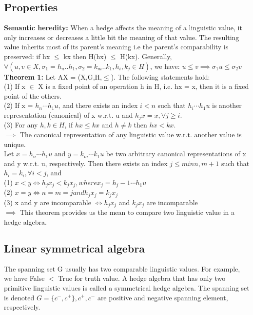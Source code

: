 \documentclass[26pt,fleqn,]{article}
\begin{document}
\subsection{Properties}
	{\bfseries Semantic heredity:} When a hedge affects the meaning of a linguistic value, it only
	increases or decreases a little bit the meaning of that value. The resulting value inherits
	most of its parent's meaning i.e the parent's comparability is preserved: 
	if hx \(\le\) kx then H(hx) \(\le\) H(kx). Generally, \(\forall (u,v \in X, 
	\sigma_1 = h_n..h_1, \sigma_2 = k_m..k_1, h_i,k_j \in H)\), we have:
	\(u \le v \implies \sigma_1u \le \sigma_2v\)\\
	{\bfseries Theorem 1:} Let AX = (X,G,H,\(\le\)). The following statements hold:\\
\indent (1) If x \(\in\) X is a fixed point of an operation h in H, i.e. hx = x, then it is a fixed
	 point of the others.\\
\indent (2) If x = \(h_n \cdots h_1 u\), and there exists an index \(i<n\) such that \(h_i \cdots h_1 u\)        is another representation (canonical) of x w.r.t. u and \(h_j x = x, \forall j\ge i\).\\
\indent (3) For any \(h, k\in H\), if \(hx\le kx\) and \(h\neq k\) then \(hx< kx\).\\
\indent \(\implies\) The canonical representation of any linguistic value w.r.t. another value is unique.	\\
 Let \(x = h_n \cdots h_1 u\) and \(y = k_m \cdots k_1 u\) be two arbitrary
	canonical representations of x and y w.r.t. u, respectively. Then there exists an index
	\(j \le min{n, m} + 1\) such that \(h_i = k_i, \forall i < j\), and\\
\indent (1) \(x < y \iff h_j x_j < k_j x_j , where x_j = h_j-1 \cdots h_1 u\)\\
\indent (2) \(x = y \iff n = m = j and h_j x_j = k_j x_j\)\\
\indent (3) x and y are incomparable \(\iff h_j x_j\) and \(k_j x_j\) are incomparable\\
\indent \(\implies\) This theorem provides us the mean to compare two linguistic value in a hedge 
algebra. 

\subsection{Linear symmetrical algebra}
The spanning set G usually has two comparable linguistic values. For example, we have False \(<\) True
for truth value. A hedge algebra that has only two primitive linguistic values is called a symmetrical
hedge algebra. The spanning set is denoted \(G = \{c^-, c^+\}, c^+, c^-\) are positive and negative 
spanning element, respectively.\\\\
\end{document}
